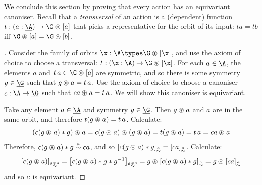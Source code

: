 We conclude this section by proving that every action has an
equivariant canoniser. Recall that a \emph{transversal} of an action
is a (dependent) function $t : (a : \carrier \A) \to \G\act\bracks a$
that picks a representative for the orbit of its input: $t a = t b$
iff $\G\act\bracks a = \G\act\bracks b$.

\begin{proof}[]%
  Consider the family of orbits $\x : \A \types \OrbitOf\x$, and use
  the axiom of choice to choose a transversal: $t : \DFun\x\A
  \OrbitOf\x$.  For each $a \in \carrier\A$, the elements $a$ and $t\,a \in
  \OrbitOf a$ are symmetric, and so there is some symmetry $g \in
  \carrier\G$ such that $g \act a = t\,a$. Use the axiom of choice to
  choose a canoniser $\canoniser : \A \to \carrier\G$ such that
  $\canoniser a \act a = t\,a$. We will show this canoniser is
  equivariant.

  Take any element $a \in \carrier\A$ and symmetry $g \in \carrier\G$.
  Then $g \act a$ and $a$ are in the same orbit, and therefore $t(g \act a) = t\,a$.
  Calculate:
  \[
  \parent{\canoniser(g \act a) \mul g}\act a
  =
  \canoniser(g \act a) \act (g\act a)
  =
  t(g \act a)
  =
  t\,a
  =
  \canoniser a \act a
  \]
  Therefore, $\canoniser(g \act a) \mul g \stabeq a \canoniser a$, and so
  $\bracks{\canoniser(g \act a) \mul g}_{\stabeq a} = \bracks{\canoniser a}_{\stabeq a}$.
  Calculate:
  \[
  \bracks{\canoniser(g\act a)}_{\stabeq{g \act a}}
  =
  \bracks{\canoniser(g\act a)\mul g \mul \inv g}_{\stabeq{g \act a}}
  =
  g \act \bracks{\canoniser(g\act a)\mul g}_{\stabeq a}
  =
  g \act \bracks{\canoniser a}_{\stabeq a}
  \]
  and so $c$ is equivariant.
\end{proof}

